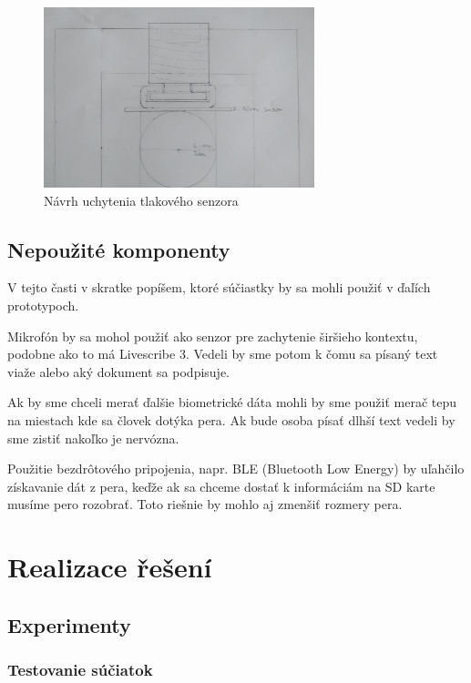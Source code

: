 \begin{figure}[hbt]
	\centering
	\includegraphics[width=0.7\textwidth]{obrazky-figures/uchytenie.png}
	\caption{Návrh uchytenia tlakového senzora}
	\label{piezoPen1997}
\end{figure}

\section{Nepoužité komponenty}

V tejto časti v skratke popíšem, ktoré súčiastky by sa mohli použiť v ďaľích prototypoch.

Mikrofón by sa mohol použiť ako senzor pre zachytenie širšieho kontextu, podobne ako to má Livescribe 3. Vedeli by sme potom k čomu sa písaný text viaže alebo aký dokument sa podpisuje. 

Ak by sme chceli merať ďalšie biometrické dáta mohli by sme použiť merač tepu na miestach kde sa človek dotýka pera. Ak bude osoba písať dlhší text vedeli by sme zistiť nakoľko je nervózna. 

Použitie bezdrôtového pripojenia, napr. BLE (Bluetooth Low Energy) by uľahčilo získavanie dát z pera, keďže ak sa chceme dostať k informáciám na SD karte musíme pero rozobrať. Toto riešnie by mohlo aj zmenšiť rozmery pera.

\chapter{Realizace řešení}

\section{Experimenty}

\subsection*{Testovanie súčiatok}

